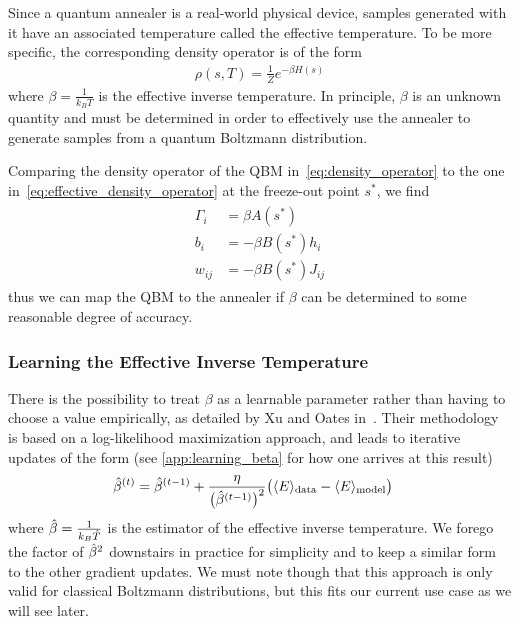 Since a quantum annealer is a real-world physical device, samples generated with it have an associated temperature called the effective temperature.
To be more specific, the corresponding density operator is of the form
\begin{align}
    \rho(s, T) = \frac{1}{Z} e^{-\beta H(s)}
\label{eq:effective_density_operator}
\end{align}
where \( \beta = \frac{1}{k_B T} \) is the effective inverse temperature.
In principle, \( \beta \) is an unknown quantity and must be determined in order to effectively use the annealer to generate samples from a quantum Boltzmann distribution.

Comparing the density operator of the QBM in~\cref{eq:density_operator} to the one in~\cref{eq:effective_density_operator} at the freeze-out point \( s^* \), we find
\begin{align}
\begin{split}
    \Gamma_i
        &= \beta A(s^*) \\
    b_i
        &= -\beta B(s^*) h_i \\
    w_{ij}
        &= -\beta B(s^*) J_{ij}
    \label{eq:qbm_scaling}
\end{split}
\end{align}
thus we can map the QBM to the annealer if \( \beta \) can be determined to some reasonable degree of accuracy.

\subsubsection{Learning the Effective Inverse Temperature}\label{sec:learning_beta}
There is the possibility to treat \( \beta \) as a learnable parameter rather than having to choose a value empirically, as detailed by Xu and Oates in~\cite{xu_2021}.
Their methodology is based on a log-likelihood maximization approach, and leads to iterative updates of the form (see \cref{app:learning_beta} for how one arrives at this result)
\begin{align}
    \hat{\beta}^{(t)}
        &= \hat{\beta}^{(t-1)} + \frac{\eta}{\big(\hat{\beta}^{(t-1)}\big)^2}\big(\langle E \rangle_\text{data} - \langle E \rangle_\text{model}\big)
\end{align}
where \( \hat{\beta} = \frac{1}{k_B\hat{T}} \) is the estimator of the effective inverse temperature.
We forego the factor of \( \hat{\beta}^2 \) downstairs in practice for simplicity and to keep a similar form to the other gradient updates.
We must note though that this approach is only valid for classical Boltzmann distributions, but this fits our current use case as we will see later.

